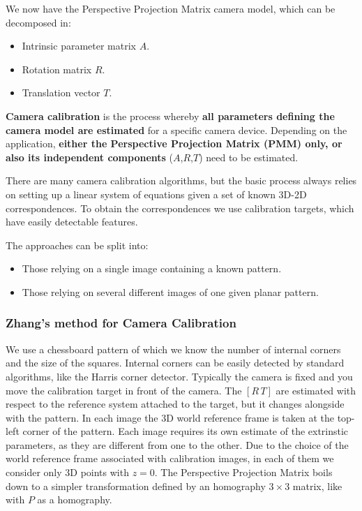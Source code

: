 \documentclass{article}
\begin{document}
We now have the Perspective Projection Matrix camera model, which can be decomposed in:
\begin{itemize}
  \item Intrinsic parameter matrix $A$.
  \item Rotation matrix $R$.
  \item Translation vector $T$.
\end{itemize}

\textbf{Camera calibration} is the process whereby \textbf{all parameters defining the camera model are estimated} for a specific camera device.
Depending on the application, \textbf{either the Perspective Projection Matrix (PMM) only, or also its independent components} ($A$,$R$,$T$) need to be estimated.

There are many camera calibration algorithms, but the basic process always relies on setting up a linear system of equations given a set of known 3D-2D correspondences.
To obtain the correspondences we use calibration targets, which have easily detectable features.

The approaches can be split into:
\begin{itemize}
  \item Those relying on a single image containing a known pattern.
  \item Those relying on several different images of one given planar pattern.
\end{itemize}

\subsubsection{Zhang's method for Camera Calibration}

We use a chessboard pattern of which we know the number of internal corners and the size of the squares.
Internal corners can be easily detected by standard algorithms, like the Harris corner detector.
Typically the camera is fixed and you move the calibration target in front of the camera.
The $[R\,T]$ are estimated with respect to the reference system attached to the target, but it changes alongside with the pattern.
In each image the 3D world reference frame is taken at the top-left corner of the pattern.
Each image requires its own estimate of the extrinstic parameters, as they are different from one to the other.
Due to the choice of the world reference frame associated with calibration images, in each of them we consider only 3D points with $z=0$.
The Perspective Projection Matrix boils down to a simpler transformation defined by an homography $3\times 3$ matrix, like with $P$ as a homography.
\end{document}
